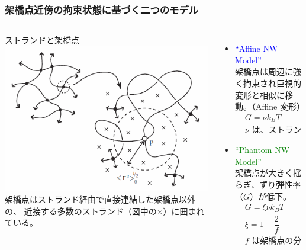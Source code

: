 \documentclass[12pt, dvipdfmx]{beamer}
\begin{document}
\begin{frame}
	\frametitle{架橋点近傍の拘束状態に基づく二つのモデル}
		\begin{columns}[totalwidth=1\textwidth]
				\begin{block}{ストランドと架橋点}
					\includegraphics[width=\textwidth]{JP_vicinity.png}
					架橋点はストランド経由で直接連結した架橋点以外の、
					\alert{近接する多数のストランド（図中の×）に囲まれている。}
				\end{block}
			\begin{itemize}
				\item \textcolor{blue}{``Affine NW Model''}\\
					架橋点は周辺に強く拘束され巨視的変形と相似に移動。（Affine 変形）
					\footnotesize
					\begin{align*}
						&G=\nu k_B T \\
						&\text{$\nu$ は、ストランドの数密度}
					\end{align*}
					\normalsize
				\item \textcolor{green}{``Phantom NW Model''}\\
					架橋点が大きく揺らぎ、ずり弾性率（$G$）が低下。
					\footnotesize
					\begin{align*}
						&G=\xi \nu k_B T \\
						&\xi= 1 -\dfrac{2}{f}\\
						&\text{$f$ は架橋点の分岐数}
					\end{align*}
			\end{itemize}
		\end{columns}
\end{frame}
\end{document}
